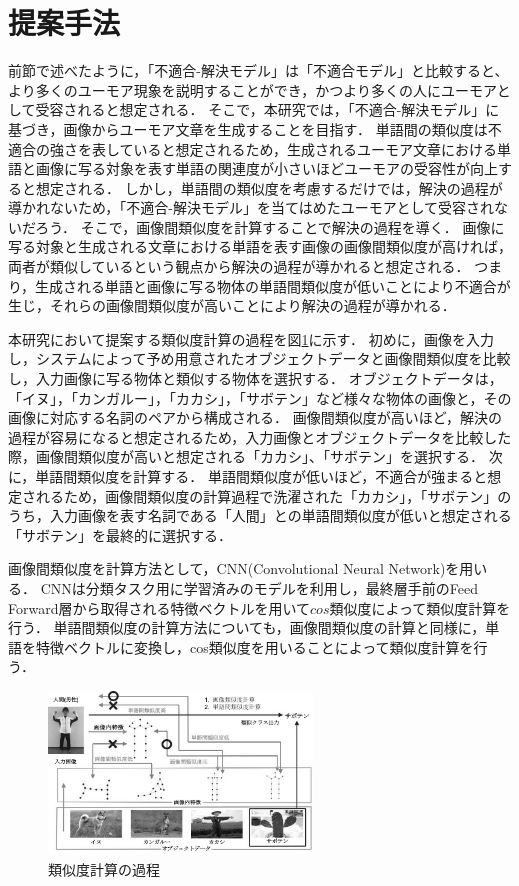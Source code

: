 \documentclass[twocolumn,2pt]{jarticle}
\begin{document}
\section{提案手法}
前節で述べたように，「不適合-解決モデル」は「不適合モデル」と比較すると、より多くのユーモア現象を説明することができ，かつより多くの人にユーモアとして受容されると想定される．
そこで，本研究では，「不適合-解決モデル」に基づき，画像からユーモア文章を生成することを目指す．
単語間の類似度は不適合の強さを表していると想定されるため\cite{kao}，生成されるユーモア文章における単語と画像に写る対象を表す単語の関連度が小さいほどユーモアの受容性が向上すると想定される．
しかし，単語間の類似度を考慮するだけでは，解決の過程が導かれないため，「不適合-解決モデル」を当てはめたユーモアとして受容されないだろう．
そこで，画像間類似度を計算することで解決の過程を導く．
画像に写る対象と生成される文章における単語を表す画像の画像間類似度が高ければ，両者が類似しているという観点から解決の過程が導かれると想定される．
つまり，生成される単語と画像に写る物体の単語間類似度が低いことにより不適合が生じ，それらの画像間類似度が高いことにより解決の過程が導かれる．



本研究において提案する類似度計算の過程を図\ref{fig:flow}に示す．
初めに，画像を入力し，システムによって予め用意されたオブジェクトデータと画像間類似度を比較し，入力画像に写る物体と類似する物体を選択する．
オブジェクトデータは，「イヌ」，「カンガルー」，「カカシ」，「サボテン」など様々な物体の画像と，その画像に対応する名詞のペアから構成される．
画像間類似度が高いほど，解決の過程が容易になると想定されるため，入力画像とオブジェクトデータを比較した際，画像間類似度が高いと想定される「カカシ」、「サボテン」を選択する．
次に，単語間類似度を計算する．
単語間類似度が低いほど，不適合が強まると想定されるため，画像間類似度の計算過程で洗濯された「カカシ」，「サボテン」のうち，入力画像を表す名詞である「人間」との単語間類似度が低いと想定される「サボテン」を最終的に選択する．



画像間類似度を計算方法として，CNN(Convolutional Neural Network)を用いる．
CNNは分類タスク用に学習済みのモデルを利用し，最終層手前のFeed Forward層から取得される特徴ベクトルを用いて$cos$類似度によって類似度計算を行う．
単語間類似度の計算方法についても，画像間類似度の計算と同様に，単語を特徴ベクトルに変換し，cos類似度を用いることによって類似度計算を行う．


\begin{figure}
	\begin{center}
		\includegraphics[width=7cm]{images/flow_gray.jpg}
		\caption{類似度計算の過程}
		\label{fig:flow}
	\end{center}
\end{figure}
\end{document}
